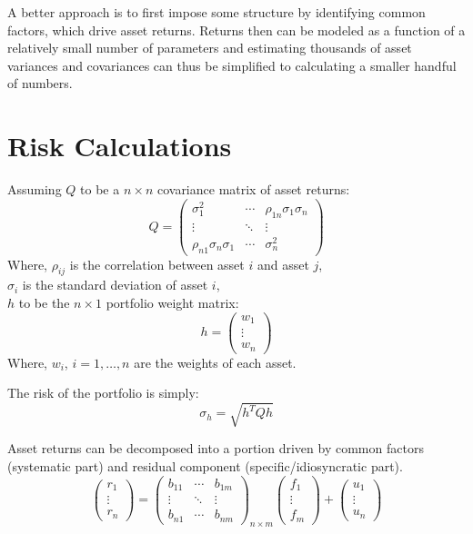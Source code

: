 \documentclass{article}
\begin{document}
A better approach is to first impose some structure by identifying common factors, which drive asset returns. Returns then can be modeled as a function of a relatively small number of parameters and estimating thousands of asset variances and covariances can thus be simplified to calculating a smaller handful of numbers.

\section*{Risk Calculations}
Assuming \( Q \) to be a \( n \times n \) covariance matrix of asset returns: \\
\begin{equation}
Q = \begin{pmatrix}
\sigma_1^2 & \cdots & \rho_{1n}\sigma_1\sigma_n \\
\vdots & \ddots & \vdots \\
\rho_{n1}\sigma_n\sigma_1 & \cdots & \sigma_n^2
\end{pmatrix}
\end{equation}
Where, \( \rho_{ij} \) is the correlation between asset \( i \) and asset \( j \), \\
\( \sigma_i \) is the standard deviation of asset \( i \), \\

\( h \) to be the \( n \times 1 \) portfolio weight matrix:
\begin{equation}
h = \begin{pmatrix}
w_1 \\
\vdots \\
w_n
\end{pmatrix}
\end{equation}
Where, \( w_i \), \( i = 1, \ldots, n \) are the weights of each asset.

The risk of the portfolio is simply:
\begin{equation}
    \sigma_h = \sqrt{h^T Q h}
\end{equation}

Asset returns can be decomposed into a portion driven by common factors (systematic part) and residual component (specific/idiosyncratic part).
\begin{equation}
\begin{pmatrix}
r_1 \\
\vdots \\
r_n
\end{pmatrix}
=
\begin{pmatrix}
b_{11} & \cdots & b_{1m} \\
\vdots & \ddots & \vdots \\
b_{n1} & \cdots & b_{nm}
\end{pmatrix}_{n \times m}
\begin{pmatrix}
f_1 \\
\vdots \\
f_m
\end{pmatrix}
+
\begin{pmatrix}
u_1 \\
\vdots \\
u_n
\end{pmatrix}
\end{equation}
\end{document}
